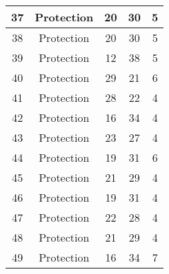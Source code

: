 \documentclass[results.tex]{subfiles}
\begin{document}
\begin{center}
\begin{tabular}{| c || c | c | c | c |}
            \hline
            37                      & Protection                   & 20                     & 30                      & 5                    \\
            \hline
            38                      & Protection                   & 20                     & 30                      & 5                    \\
            \hline
            39                      & Protection                   & 12                     & 38                      & 5                    \\
            \hline
            40                      & Protection                   & 29                     & 21                      & 6                    \\
            \hline
            41                      & Protection                   & 28                     & 22                      & 4                    \\
            \hline
            42                      & Protection                   & 16                     & 34                      & 4                    \\
            \hline
            43                      & Protection                   & 23                     & 27                      & 4                    \\
            \hline
            44                      & Protection                   & 19                     & 31                      & 6                    \\
            \hline
            45                      & Protection                   & 21                     & 29                      & 4                    \\
            \hline
            46                      & Protection                   & 19                     & 31                      & 4                    \\
            \hline
            47                      & Protection                   & 22                     & 28                      & 4                    \\
            \hline
            48                      & Protection                   & 21                     & 29                      & 4                    \\
            \hline
            49                      & Protection                   & 16                     & 34                      & 7                    \\
            \hline
        \end{tabular}
    \end{center}
\end{document}
